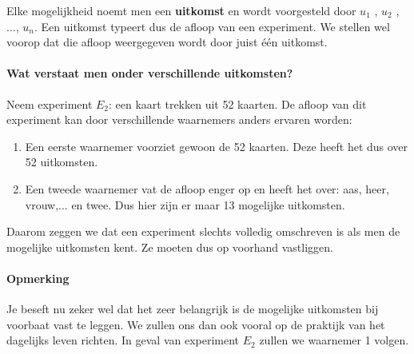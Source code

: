 \documentclass[12pt,twoside]{article}
\begin{document}
Elke mogelijkheid noemt men een {\bf uitkomst} en wordt voorgesteld door $u_1$ , $u_2$ , $\ldots$, $u_n$. Een uitkomst typeert dus de afloop van een experiment. We stellen wel voorop dat die afloop weergegeven wordt door juist één uitkomst.

\paragraph*{Wat verstaat men onder verschillende uitkomsten?}

Neem experiment $E_2$: een kaart trekken uit 52 kaarten. De afloop van dit experiment
kan door verschillende waarnemers anders ervaren worden:
\begin{enumerate}
  \item Een eerste waarnemer voorziet gewoon de 52 kaarten. Deze heeft het dus over 52 uitkomsten.
  \item Een tweede waarnemer vat de afloop enger op en heeft het over: aas, heer, vrouw,... en twee. Dus hier zijn er maar 13 mogelijke uitkomsten.
\end{enumerate}

Daarom zeggen we dat een experiment slechts volledig omschreven is als men de mogelijke uitkomsten kent. Ze moeten dus op voorhand vastliggen.

\paragraph*{Opmerking}
Je beseft nu zeker wel dat het zeer belangrijk is de mogelijke uitkomsten bij
voorbaat vast te leggen. We zullen ons dan ook vooral op de praktijk van het dagelijks
leven richten. In geval van experiment $E_2$ zullen we waarnemer 1 volgen.
\end{document}
